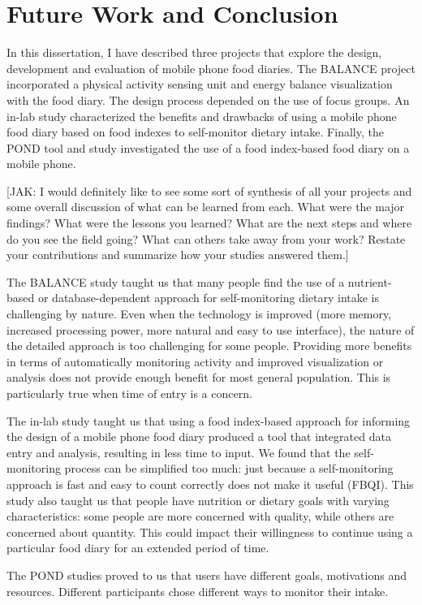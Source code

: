 \chapter{Future Work and Conclusion}
In this dissertation, I have described three projects that explore the design,  development and evaluation of mobile phone food diaries. The BALANCE project incorporated a physical activity sensing unit and energy balance visualization with the food diary. The design process depended on the use of focus groups. An in-lab study characterized the benefits and drawbacks of using a mobile phone food diary based on food indexes to self-monitor dietary intake. Finally, the POND tool and study investigated the use of a food index-based food diary on a mobile phone. 

[JAK: I would definitely like to see some sort of synthesis of all your projects and some overall discussion of what can be learned from each. What were the major findings? What were the lessons you learned? What are the next steps and where do you see the field going? What can others take away from your work? Restate your contributions and summarize how your studies answered them.] 

The BALANCE study taught us that many people find the use of a nutrient-based or database-dependent approach for self-monitoring dietary intake is challenging by nature. Even when the technology is improved (more memory, increased processing power, more natural and easy to use interface), the nature of the detailed approach is too challenging for some people. Providing more benefits in terms of automatically monitoring activity and improved visualization or analysis does not provide enough benefit for most general population. This is particularly true when time of entry is a concern. 

The in-lab study taught us that using a food index-based approach for informing the design of a mobile phone food diary produced a tool that integrated data entry and analysis, resulting in less time to input. We found that the self-monitoring process can be simplified too much: just because a self-monitoring approach is fast and easy to count correctly does not make it useful (FBQI). This study also taught us that people have nutrition or dietary goals with varying characteristics: some people are more concerned with quality, while others are concerned about quantity. This could impact their willingness to continue using a particular food diary for an extended period of time. 

The POND studies proved to us that users have different goals, motivations and resources. Different participants chose different ways to monitor their intake. 

